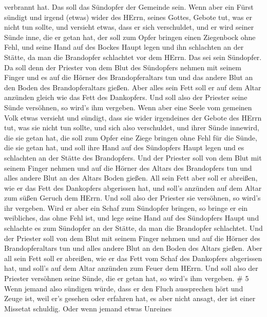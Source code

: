 verbrannt hat. Das soll das Sündopfer der Gemeinde sein. 
Wenn aber ein Fürst sündigt und irgend (etwas) wider des HErrn, seines
Gottes, Gebote tut, was er nicht tun sollte, und versieht etwas, dass er
sich verschuldet,  und er wird seiner Sünde inne, die er
getan hat, der soll zum Opfer bringen einen Ziegenbock ohne Fehl,
 und seine Hand auf des Bockes Haupt legen und ihn
schlachten an der Stätte, da man die Brandopfer schlachtet vor dem
HErrn. Das sei sein Sündopfer.  Da soll denn der Priester
von dem Blut des Sündopfers nehmen mit seinem Finger und es auf die
Hörner des Brandopferaltars tun und das andere Blut an den Boden des
Brandopferaltars gießen.  Aber alles sein Fett soll er auf
dem Altar anzünden gleich wie das Fett des Dankopfers. Und soll also der
Priester seine Sünde versöhnen, so wird's ihm vergeben. 
Wenn aber eine Seele vom gemeinen Volk etwas versieht und sündigt, dass
sie wider irgendeines der Gebote des HErrn tut, was sie nicht tun
sollte, und sich also verschuldet,  und ihrer Sünde
innewird, die sie getan hat, die soll zum Opfer eine Ziege bringen ohne
Fehl für die Sünde, die sie getan hat,  und soll ihre Hand
auf des Sündopfers Haupt legen und es schlachten an der Stätte des
Brandopfers.  Und der Priester soll von dem Blut mit seinem
Finger nehmen und auf die Hörner des Altars des Brandopfers tun und
alles andere Blut an des Altars Boden gießen.  All sein
Fett aber soll er abreißen, wie er das Fett des Dankopfers abgerissen
hat, und soll's anzünden auf dem Altar zum süßen Geruch dem HErrn. Und
soll also der Priester sie versöhnen, so wird's ihr vergeben.
 Wird er aber ein Schaf zum Sündopfer bringen, so bringe er
ein weibliches, das ohne Fehl ist,  und lege seine Hand auf
des Sündopfers Haupt und schlachte es zum Sündopfer an der Stätte, da
man die Brandopfer schlachtet.  Und der Priester soll von
dem Blut mit seinem Finger nehmen und auf die Hörner des
Brandopferaltars tun und alles andere Blut an den Boden des Altars
gießen.  Aber all sein Fett soll er abreißen, wie er das
Fett vom Schaf des Dankopfers abgerissen hat, und soll's auf dem Altar
anzünden zum Feuer dem HErrn. Und soll also der Priester versöhnen seine
Sünde, die er getan hat, so wird's ihm vergeben. \# 5  Wenn
jemand also sündigen würde, dass er den Fluch aussprechen hört und Zeuge
ist, weil er's gesehen oder erfahren hat, es aber nicht ansagt, der ist
einer Missetat schuldig.  Oder wenn jemand etwas Unreines
